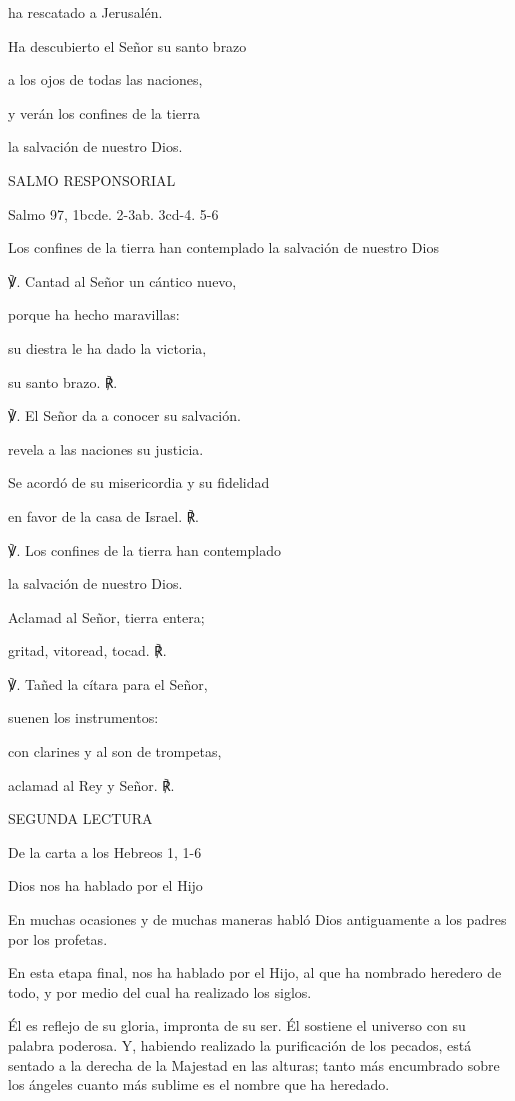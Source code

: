 \documentclass[]{article}
\begin{document}
ha rescatado a Jerusalén.

Ha descubierto el Señor su santo brazo

a los ojos de todas las naciones,

y verán los confines de la tierra

la salvación de nuestro Dios.

SALMO RESPONSORIAL

Salmo 97, 1bcde. 2-3ab. 3cd-4. 5-6

Los confines de la tierra han contemplado la salvación de nuestro Dios

℣. Cantad al Señor un cántico nuevo,

porque ha hecho maravillas:

su diestra le ha dado la victoria,

su santo brazo. ℟.

℣. El Señor da a conocer su salvación.

revela a las naciones su justicia.

Se acordó de su misericordia y su fidelidad

en favor de la casa de Israel. ℟.

℣. Los confines de la tierra han contemplado

la salvación de nuestro Dios.

Aclamad al Señor, tierra entera;

gritad, vitoread, tocad. ℟.

℣. Tañed la cítara para el Señor,

suenen los instrumentos:

con clarines y al son de trompetas,

aclamad al Rey y Señor. ℟.

SEGUNDA LECTURA

De la carta a los Hebreos 1, 1-6

Dios nos ha hablado por el Hijo

En muchas ocasiones y de muchas maneras habló Dios antiguamente a los
padres por los profetas.

En esta etapa final, nos ha hablado por el Hijo, al que ha nombrado
heredero de todo, y por medio del cual ha realizado los siglos.

Él es reflejo de su gloria, impronta de su ser. Él sostiene el universo
con su palabra poderosa. Y, habiendo realizado la purificación de los
pecados, está sentado a la derecha de la Majestad en las alturas; tanto
más encumbrado sobre los ángeles cuanto más sublime es el nombre que ha
heredado.
\end{document}
